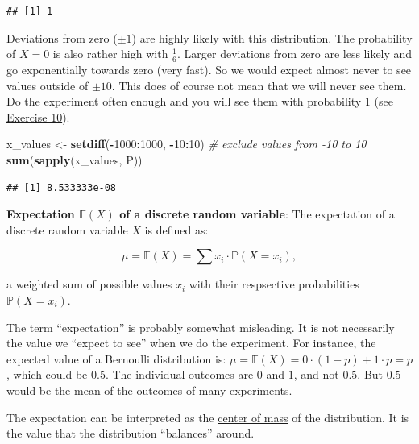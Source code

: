 \documentclass[
]{book}
\newenvironment{Shaded}{\begin{snugshade}}{\end{snugshade}}
\newcommand{\CommentTok}[1]{\textcolor[rgb]{0.56,0.35,0.01}{\textit{#1}}}
\newcommand{\DecValTok}[1]{\textcolor[rgb]{0.00,0.00,0.81}{#1}}
\newcommand{\FunctionTok}[1]{\textcolor[rgb]{0.13,0.29,0.53}{\textbf{#1}}}
\newcommand{\NormalTok}[1]{#1}
\newcommand{\OtherTok}[1]{\textcolor[rgb]{0.56,0.35,0.01}{#1}}
\newcommand{\SpecialCharTok}[1]{\textcolor[rgb]{0.81,0.36,0.00}{\textbf{#1}}}
\begin{document}
\begin{verbatim}
## [1] 1
\end{verbatim}

Deviations from zero (\(\pm 1\)) are highly likely with this distribution. The probability of \(X=0\) is also rather high with \(\frac{1}{6}\).
Larger deviations from zero are less likely and go exponentially towards zero (very fast). So we would expect almost never to see values outside
of \(\pm 10\). This does of course not mean that we will never see them. Do the experiment often enough and you will see them with
probability 1 (see \hyperref[exercise10]{Exercise 10}).

\begin{Shaded}
\begin{Highlighting}[]
\NormalTok{x\_values }\OtherTok{\textless{}{-}} \FunctionTok{setdiff}\NormalTok{(}\SpecialCharTok{{-}}\DecValTok{1000}\SpecialCharTok{:}\DecValTok{1000}\NormalTok{, }\SpecialCharTok{{-}}\DecValTok{10}\SpecialCharTok{:}\DecValTok{10}\NormalTok{) }\CommentTok{\# exclude values from {-}10 to 10}
\FunctionTok{sum}\NormalTok{(}\FunctionTok{sapply}\NormalTok{(x\_values, P))}
\end{Highlighting}
\end{Shaded}

\begin{verbatim}
## [1] 8.533333e-08
\end{verbatim}

\textbf{Expectation \(\mathbb{E}(X)\) of a discrete random variable}: The expectation of a discrete random variable \(X\) is defined as:

\[\mu = \mathbb{E}(X) = \sum x_i \cdot \mathbb{P}(X = x_i),\]

a weighted sum of possible values \(x_i\) with their respsective probabilities \(\mathbb{P}(X = x_i)\).

The term ``expectation'' is probably somewhat misleading. It is not necessarily the value we ``expect to see'' when we do the experiment. For instance,
the expected value of a Bernoulli distribution is: \(\mu = \mathbb{E}(X) = 0 \cdot (1-p) + 1 \cdot p = p\), which could be \(0.5\). The individual outcomes are \(0\) and \(1\),
and not \(0.5\). But \(0.5\) would be the mean of the outcomes of many experiments.

The expectation can be interpreted as the \href{https://mathcenter.oxford.emory.edu/site/math117/expectedValueAndCenterOfMass/}{center of mass}
of the distribution. It is the value that the distribution ``balances'' around.
\end{document}
